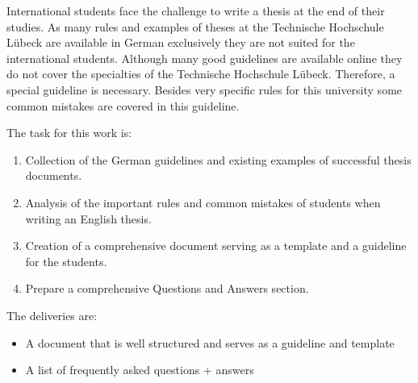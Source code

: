 \noindent International students face the challenge to write a thesis at the end of their studies. As many rules and examples of theses at the Technische Hochschule Lübeck are available in German exclusively they are not suited for the international students. Although many good guidelines are available online they do not cover the specialties of the Technische Hochschule Lübeck. Therefore, a special guideline is necessary. Besides very specific rules for this university some common mistakes are covered in this guideline.

\noindent The task for this work is:
\begin{enumerate}
\item Collection of the German guidelines and existing examples of successful thesis documents.
\item Analysis of the important rules and common mistakes of students when writing an English thesis.
\item	Creation of a comprehensive document serving as a template and a guideline for the students.
\item	Prepare a comprehensive Questions and Answers section.
\end{enumerate}

\noindent The deliveries are:
\begin{itemize}
\item A document that is well structured and serves as a guideline and template
\item A list of frequently asked questions + answers
\end{itemize}